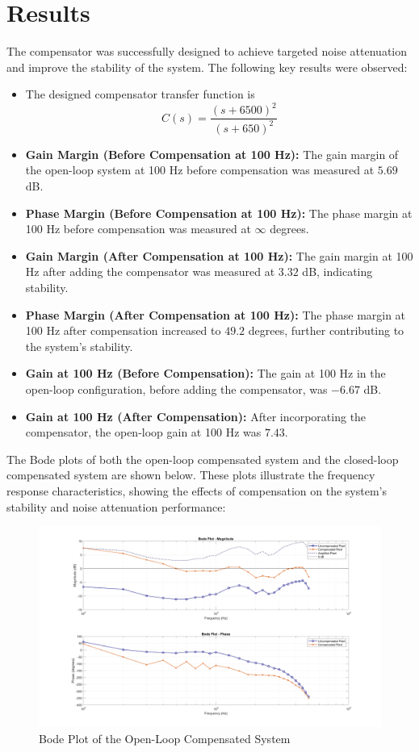 \documentclass{article}
\begin{document}
\section{Results}

The compensator was successfully designed to achieve targeted noise attenuation and improve the stability of the system. The following key results were observed:

\begin{itemize}%
    \item The designed compensator transfer function is $$C(s) = \frac{(s+6500)^2}{(s+650)^2}$$
    \item \textbf{Gain Margin (Before Compensation at 100 Hz):} The gain margin of the open-loop system at 100 Hz before compensation was measured at \( 5.69 \) dB.
    \item \textbf{Phase Margin (Before Compensation at 100 Hz):} The phase margin at 100 Hz before compensation was measured at \( \infty \) degrees.
    \item \textbf{Gain Margin (After Compensation at 100 Hz):} The gain margin at 100 Hz after adding the compensator was measured at \( 3.32 \) dB, indicating stability.
    \item \textbf{Phase Margin (After Compensation at 100 Hz):} The phase margin at 100 Hz after compensation increased to \( 49.2 \) degrees, further contributing to the system's stability.
    \item \textbf{Gain at 100 Hz (Before Compensation):} The gain at 100 Hz in the open-loop configuration, before adding the compensator, was \( -6.67 \) dB.
    \item \textbf{Gain at 100 Hz (After Compensation):} After incorporating the compensator, the open-loop gain at 100 Hz was \( 7.43 \).
\end{itemize}

The Bode plots of both the open-loop compensated system and the closed-loop compensated system are shown below. These plots illustrate the frequency response characteristics, showing the effects of compensation on the system's stability and noise attenuation performance:

\begin{figure}[!htb]
    \centering
    \includegraphics[width=\textwidth]{open_loop_2.png}
    \caption{Bode Plot of the Open-Loop Compensated System}
    \label{fig:bode_open_loop}
\end{figure}
\end{document}

